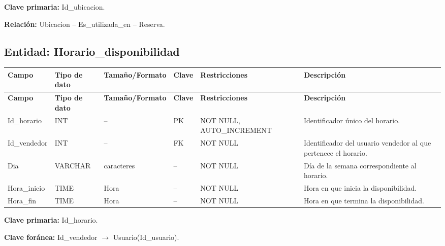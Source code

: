 \documentclass[12pt]{article} %
\begin{document}
\textbf{Clave primaria:} Id\_ubicacion.

\textbf{Relación:}
Ubicacion -- Es\_utilizada\_en -- Reserva.



\subsection{Entidad: Horario\_disponibilidad}

\begin{longtable}{>{\raggedright\arraybackslash}p{2.5cm}
                  >{\raggedright\arraybackslash}p{2.0cm}
                  >{\raggedright\arraybackslash}p{2.2cm}
                  >{\raggedright\arraybackslash}p{1.2cm}
                  >{\raggedright\arraybackslash}p{3.0cm}
                  >{\raggedright\arraybackslash}p{4.0cm}}
\toprule
\textbf{Campo} &
\textbf{Tipo de dato} &
\textbf{Tamaño/Formato} &
\textbf{Clave} &
\textbf{Restricciones} &
\textbf{Descripción} \\
\midrule
\endfirsthead

\toprule
\textbf{Campo} &
\textbf{Tipo de dato} &
\textbf{Tamaño/Formato} &
\textbf{Clave} &
\textbf{Restricciones} &
\textbf{Descripción} \\
\midrule
\endhead

Id\_horario &
INT &
-- &
PK &
NOT NULL, AUTO\_INCREMENT &
Identificador único del horario. \\

Id\_vendedor &
INT &
-- &
FK &
NOT NULL &
Identificador del usuario vendedor al que pertenece el horario. \\

Dia &
VARCHAR &
15 caracteres &
-- &
NOT NULL &
Día de la semana correspondiente al horario. \\

Hora\_inicio &
TIME &
Hora &
-- &
NOT NULL &
Hora en que inicia la disponibilidad. \\

Hora\_fin &
TIME &
Hora &
-- &
NOT NULL &
Hora en que termina la disponibilidad. \\

\bottomrule
\end{longtable}

\textbf{Clave primaria:} Id\_horario.

\textbf{Clave foránea:}
Id\_vendedor $\rightarrow$ Usuario(Id\_usuario).
\end{document}
